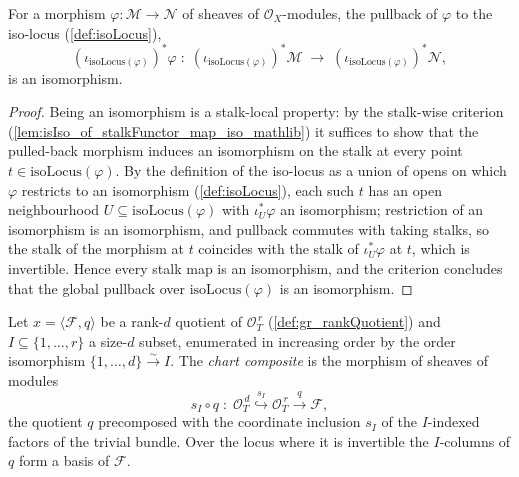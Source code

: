 \begin{lemma}
  \label{lem:isIso_pullback_isoLocus_map}
  For a morphism \(\varphi : \mathcal{M} \to \mathcal{N}\) of sheaves of
  \(\mathcal{O}_X\)-modules, the pullback of \(\varphi\) to the iso-locus
  (\cref{def:isoLocus}),
  \[
    (\iota_{\mathrm{isoLocus}(\varphi)})^{*}\varphi
      \;:\;
    (\iota_{\mathrm{isoLocus}(\varphi)})^{*}\mathcal{M}
      \;\longrightarrow\;
    (\iota_{\mathrm{isoLocus}(\varphi)})^{*}\mathcal{N},
  \]
  is an isomorphism.
\end{lemma}
\begin{proof}
  Being an isomorphism is a stalk-local property: by the stalk-wise criterion
  (\cref{lem:isIso_of_stalkFunctor_map_iso_mathlib}) it suffices to show that the pulled-back
  morphism induces an isomorphism on the stalk at every point \(t \in
  \mathrm{isoLocus}(\varphi)\). By the definition of the iso-locus as a union of opens on
  which \(\varphi\) restricts to an isomorphism (\cref{def:isoLocus}), each such \(t\) has an
  open neighbourhood \(U \subseteq \mathrm{isoLocus}(\varphi)\) with \(\iota_U^{*}\varphi\) an
  isomorphism; restriction of an isomorphism is an isomorphism, and pullback commutes with
  taking stalks, so the stalk of the morphism at \(t\) coincides with the stalk of
  \(\iota_U^{*}\varphi\) at \(t\), which is invertible. Hence every stalk map is an
  isomorphism, and the criterion concludes that the global pullback over
  \(\mathrm{isoLocus}(\varphi)\) is an isomorphism.
\end{proof}

\begin{definition}
  \label{def:gr_chartComposite}
  Let \(x = \langle \mathcal{F}, q\rangle\) be a rank-\(d\) quotient of
  \(\mathcal{O}_T^{\,r}\) (\cref{def:gr_rankQuotient}) and \(I \subseteq \{1,\dots,r\}\) a
  size-\(d\) subset, enumerated in increasing order by the order isomorphism
  \(\{1,\dots,d\} \xrightarrow{\sim} I\). The \emph{chart composite} is the morphism of
  sheaves of modules
  \[
    s_I \circ q \;:\; \mathcal{O}_T^{\,d}
      \overset{\ s_I\ }{\hookrightarrow} \mathcal{O}_T^{\,r}
      \xrightarrow{\ q\ } \mathcal{F},
  \]
  the quotient \(q\) precomposed with the coordinate inclusion \(s_I\) of the
  \(I\)-indexed factors of the trivial bundle. Over the locus where it is invertible the
  \(I\)-columns of \(q\) form a basis of \(\mathcal{F}\).
\end{definition}

